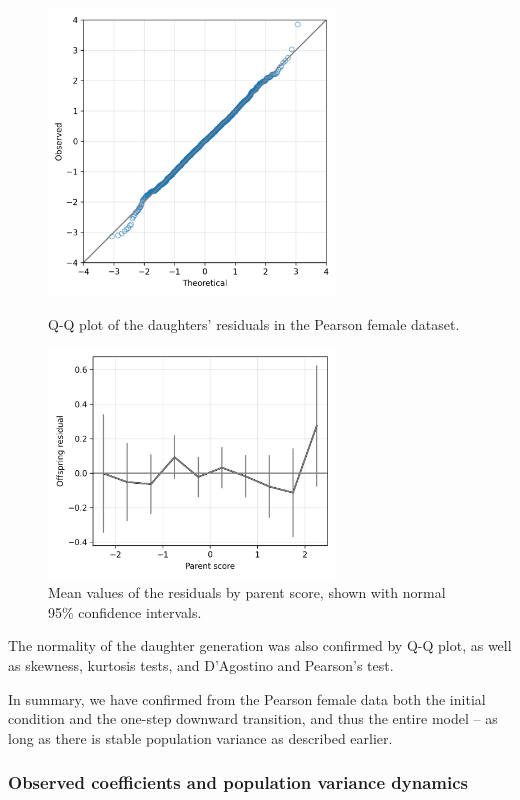 \documentclass[a4paper,11pt]{article} %
\begin{document}
\begin{figure}[p]
\includegraphics[width=3in]{figures/qq_pearson_epsi.png}
\centering
\caption{Q-Q plot of the daughters' residuals in the Pearson female dataset.}
\label{fig:qq_pearson_epsi}

\vspace{2cm}

\includegraphics[width=3in]{figures/pearson_residuals_by_score.png}
\centering
\caption{Mean values of the residuals by parent score, shown with normal 95\% confidence intervals.}
\label{fig:pearson_residuals_by_score}
\end{figure}

The normality of the daughter generation was also confirmed by Q-Q plot, as well as skewness, kurtosis tests, and D’Agostino and Pearson's test.

In summary, we have confirmed from the Pearson female data both the initial condition and the one-step downward transition, and thus the entire model -- as long as there is stable population variance as described earlier. 


\subsubsection*{Observed coefficients and population variance dynamics}
\end{document}
